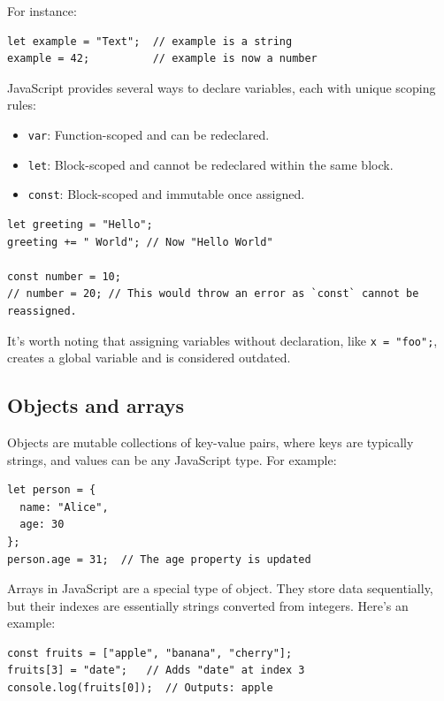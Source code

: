 For instance:
\begin{verbatim}
let example = "Text";  // example is a string
example = 42;          // example is now a number
\end{verbatim}
JavaScript provides several ways to declare variables, each with unique scoping rules:
\begin{itemize}
    \item \texttt{var}: Function-scoped and can be redeclared.
    \item \texttt{let}: Block-scoped and cannot be redeclared within the same block.
    \item \texttt{const}: Block-scoped and immutable once assigned.
\end{itemize}

\begin{verbatim}
let greeting = "Hello";
greeting += " World"; // Now "Hello World"

const number = 10;
// number = 20; // This would throw an error as `const` cannot be reassigned.
\end{verbatim}
It's worth noting that assigning variables without declaration, like \texttt{x = "foo";}, creates a global variable and is considered outdated.

\subsection*{Objects and arrays}
Objects are mutable collections of key-value pairs, where keys are typically strings, and values can be any JavaScript type. For example:
\begin{verbatim}
let person = {
  name: "Alice",
  age: 30
};
person.age = 31;  // The age property is updated
\end{verbatim}
Arrays in JavaScript are a special type of object. They store data sequentially, but their indexes are essentially strings converted from integers. Here's an example:
\begin{verbatim}
const fruits = ["apple", "banana", "cherry"];
fruits[3] = "date";   // Adds "date" at index 3
console.log(fruits[0]);  // Outputs: apple
\end{verbatim}

